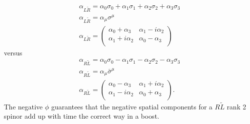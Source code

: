 \begin{equation}
\begin{split}
&\alpha_{L\tilde{R}} = \alpha_0 \sigma_0 + \alpha_1 \sigma_1 + \alpha_2 \sigma_2 + \alpha_3 \sigma_3 \\
&\alpha_{L\tilde{R}} = \alpha_\mu \sigma^\mu \\
&\alpha_{L\tilde{R}} = 
\begin{pmatrix}
\alpha_0 + \alpha_3 & \alpha_1 - i\alpha_2 \\
\alpha_1 + i\alpha_2 & \alpha_0 - \alpha_3 \\
\end{pmatrix}
\end{split}
\end{equation}
versus
\begin{equation}
\begin{split}
&\alpha_{R\tilde{L}} = \alpha_0 \sigma_0 - \alpha_1 \sigma_1 - \alpha_2 \sigma_2 - \alpha_3 \sigma_3 \\
&\alpha_{R\tilde{L}} = \alpha_\mu \bar{\sigma}^\mu \\
&\alpha_{R\tilde{L}} = 
\begin{pmatrix}
\alpha_0 - \alpha_3 & \alpha_1 + i\alpha_2 \\
\alpha_1 - i\alpha_2 & \alpha_0 + \alpha_3 \\
\end{pmatrix}.
\end{split}
\end{equation}
The negative $\phi$ guarantees that the negative spatial components for a $R\tilde{L}$ rank 2 spinor add up with time the correct way in a boost.

